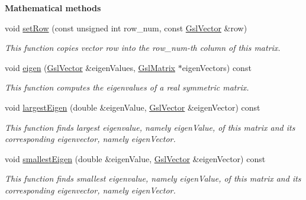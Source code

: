 \begin{Indent}{\bf Mathematical methods}
\begin{DoxyCompactItemize}
void \hyperlink{class_q_u_e_s_o_1_1_gsl_matrix_acc28c25e1d3c43809be718d5b0c01d29}{set\-Row} (const unsigned int row\-\_\-num, const \hyperlink{class_q_u_e_s_o_1_1_gsl_vector}{Gsl\-Vector} \&row)
\begin{DoxyCompactList}\small\item\em This function copies vector {\ttfamily row} into the row\-\_\-num-\/th column of {\ttfamily this} matrix. \end{DoxyCompactList}\item 
void \hyperlink{class_q_u_e_s_o_1_1_gsl_matrix_a70dda1ec31c9cc876f7e4bb43e33555b}{eigen} (\hyperlink{class_q_u_e_s_o_1_1_gsl_vector}{Gsl\-Vector} \&eigen\-Values, \hyperlink{class_q_u_e_s_o_1_1_gsl_matrix}{Gsl\-Matrix} $\ast$eigen\-Vectors) const 
\begin{DoxyCompactList}\small\item\em This function computes the eigenvalues of a real symmetric matrix. \end{DoxyCompactList}\item 
void \hyperlink{class_q_u_e_s_o_1_1_gsl_matrix_adebe56d583e87e7298a0a9a374b19818}{largest\-Eigen} (double \&eigen\-Value, \hyperlink{class_q_u_e_s_o_1_1_gsl_vector}{Gsl\-Vector} \&eigen\-Vector) const 
\begin{DoxyCompactList}\small\item\em This function finds largest eigenvalue, namely {\ttfamily eigen\-Value}, of {\ttfamily this} matrix and its corresponding eigenvector, namely {\ttfamily eigen\-Vector}. \end{DoxyCompactList}\item 
void \hyperlink{class_q_u_e_s_o_1_1_gsl_matrix_a0b0e65021705e04772259a91071af5d5}{smallest\-Eigen} (double \&eigen\-Value, \hyperlink{class_q_u_e_s_o_1_1_gsl_vector}{Gsl\-Vector} \&eigen\-Vector) const 
\begin{DoxyCompactList}\small\item\em This function finds smallest eigenvalue, namely {\ttfamily eigen\-Value}, of {\ttfamily this} matrix and its corresponding eigenvector, namely {\ttfamily eigen\-Vector}. \end{DoxyCompactList}\end{DoxyCompactItemize}
\end{Indent}
